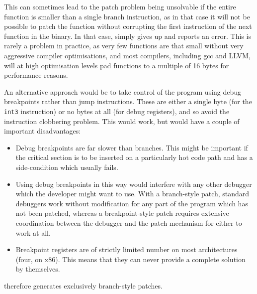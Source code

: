 This can sometimes lead to the patch problem being unsolvable if the
entire function is smaller than a single branch instruction, as in
that case it will not be possible to patch the function without
corrupting the first instruction of the next function in the binary.
In that case, {\implementation} simply gives up and reports an error.
This is rarely a problem in practice, as very few functions are that
small without very aggressive compiler optimisations, and most
compilers, including gcc\cite[Section~3.10]{Stallman2010} and
LLVM\needCite{}, will at high optimisation levels pad functions to a
multiple of 16 bytes for performance reasons.

  An
alternative approach would be to take control of the program using
debug breakpoints rather than jump instructions.  These are either a
single byte (for the \verb|int3| instruction) or no bytes at all (for
debug registers), and so avoid the instruction clobbering problem.
This would work, but would have a couple of important disadvantages:

\begin{itemize}
\item
  Debug breakpoints are far slower than branches.  This might be
  important if the critical section is to be inserted on a
  particularly hot code path and has a side-condition which usually
  fails.
\item
  Using debug breakpoints in this way would interfere with any other
  debugger which the developer might want to use.  With a branch-style
  patch, standard debuggers work without modification for any part of
  the program which has not been patched, whereas a breakpoint-style
  patch requires extensive coordination between the debugger and the
  patch mechanism for either to work at all.
\item
  Breakpoint registers are of strictly limited number on most
  architectures (four, on x86).  This means that they can never
  provide a complete solution by themselves.
\end{itemize}

{\Implementation} therefore generates exclusively branch-style patches.
